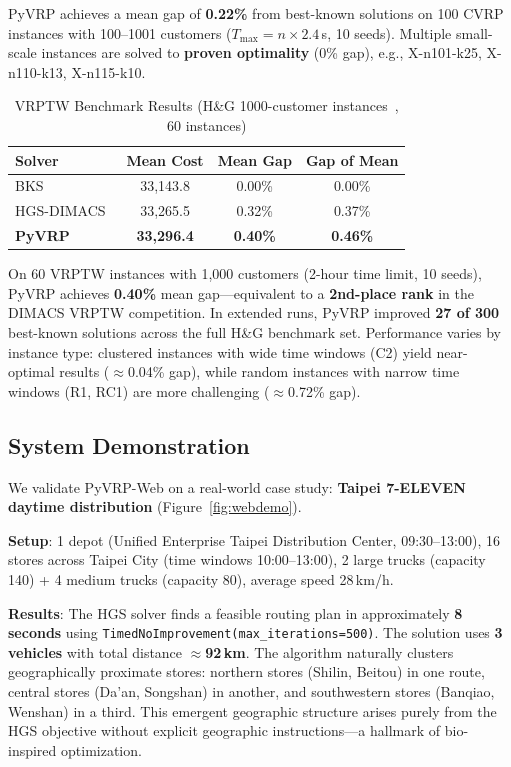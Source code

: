 \documentclass[conference]{IEEEtran}
\begin{document}
PyVRP achieves a mean gap of \textbf{0.22\%} from best-known solutions on
100 CVRP instances with 100--1001 customers ($T_{\max}=n\times2.4$\,s,
10 seeds). Multiple small-scale instances are solved to \textbf{proven
optimality} (0\% gap), e.g., X-n101-k25, X-n110-k13, X-n115-k10.

\begin{table}[h]
\caption{VRPTW Benchmark Results (H\&G 1000-customer instances~\cite{homberger1999two}, 60 instances)}
\label{tab:vrptw}
\centering
\begin{tabular}{lccc}
\toprule
\textbf{Solver} & \textbf{Mean Cost} & \textbf{Mean Gap} & \textbf{Gap of Mean} \\
\midrule
BKS              & 33,143.8 & 0.00\% & 0.00\% \\
HGS-DIMACS~\cite{kool2022hybrid} & 33,265.5 & 0.32\% & 0.37\% \\
\textbf{PyVRP~\cite{wouda2024pyvrp}} & \textbf{33,296.4} & \textbf{0.40\%} & \textbf{0.46\%} \\
\bottomrule
\end{tabular}
\end{table}

On 60 VRPTW instances with 1,000 customers (2-hour time limit, 10 seeds),
PyVRP achieves \textbf{0.40\%} mean gap---equivalent to a
\textbf{2nd-place rank} in the DIMACS VRPTW competition. In extended runs,
PyVRP improved \textbf{27 of 300} best-known solutions across the full H\&G
benchmark set. Performance varies by instance type: clustered instances with
wide time windows (C2) yield near-optimal results ($\approx$0.04\% gap),
while random instances with narrow time windows (R1, RC1) are more
challenging ($\approx$0.72\% gap).

\subsection{System Demonstration}

We validate PyVRP-Web on a real-world case study: \textbf{Taipei 7-ELEVEN
daytime distribution} (Figure~\ref{fig:webdemo}).

\textbf{Setup}: 1 depot (Unified Enterprise Taipei Distribution Center,
09:30--13:00), 16 stores across Taipei City (time windows 10:00--13:00),
2 large trucks (capacity 140) + 4 medium trucks (capacity 80), average
speed 28\,km/h.

\textbf{Results}: The HGS solver finds a feasible routing plan in
approximately \textbf{8 seconds} using \texttt{TimedNoImprovement(max\_iterations=500)}.
The solution uses \textbf{3 vehicles} with total distance $\approx$\textbf{92\,km}.
The algorithm naturally clusters geographically proximate stores: northern
stores (Shilin, Beitou) in one route, central stores (Da'an, Songshan) in
another, and southwestern stores (Banqiao, Wenshan) in a third. This
emergent geographic structure arises purely from the HGS objective without
explicit geographic instructions---a hallmark of bio-inspired optimization.
\end{document}
